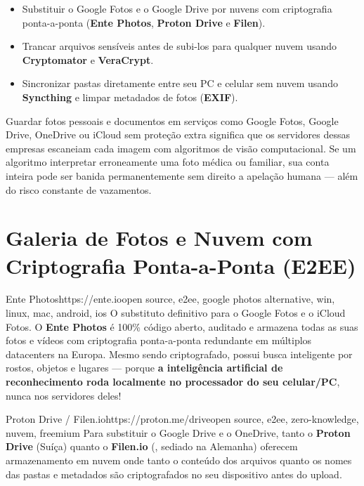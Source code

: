 \documentclass{pousadaguide}
\begin{document}
\begin{missao}
\begin{itemize}
  \item Substituir o Google Fotos e o Google Drive por nuvens com criptografia ponta-a-ponta (\textbf{Ente Photos}, \textbf{Proton Drive} e \textbf{Filen}).
  \item Trancar arquivos sensíveis antes de subi-los para qualquer nuvem usando \textbf{Cryptomator} e \textbf{VeraCrypt}.
  \item Sincronizar pastas diretamente entre seu PC e celular sem nuvem usando \textbf{Syncthing} e limpar metadados de fotos (\textbf{EXIF}).
\end{itemize}
\end{missao}

Guardar fotos pessoais e documentos em serviços como Google Fotos, Google Drive, OneDrive ou iCloud sem proteção extra significa que os servidores dessas empresas escaneiam cada imagem com algoritmos de visão computacional. Se um algoritmo interpretar erroneamente uma foto médica ou familiar, sua conta inteira pode ser banida permanentemente sem direito a apelação humana — além do risco constante de vazamentos.

\section{Galeria de Fotos e Nuvem com Criptografia Ponta-a-Ponta (E2EE)}

\begin{ferramenta}[goat,logo=ente]{Ente Photos}{https://ente.io}{open source, e2ee, google photos alternative, win, linux, mac, android, ios}
O substituto definitivo para o Google Fotos e o iCloud Fotos. O \textbf{Ente Photos} é 100\% código aberto, auditado e armazena todas as suas fotos e vídeos com criptografia ponta-a-ponta redundante em múltiplos datacenters na Europa. Mesmo sendo criptografado, possui busca inteligente por rostos, objetos e lugares — porque \textbf{a inteligência artificial de reconhecimento roda localmente no processador do seu celular/PC}, nunca nos servidores deles! 
\end{ferramenta}

\begin{ferramenta}[goat,logo=protondrive]{Proton Drive / Filen.io}{https://proton.me/drive}{open source, e2ee, zero-knowledge, nuvem, freemium}
Para substituir o Google Drive e o OneDrive, tanto o \textbf{Proton Drive} (Suíça) quanto o \textbf{Filen.io} (, sediado na Alemanha) oferecem armazenamento em nuvem onde tanto o conteúdo dos arquivos quanto os nomes das pastas e metadados são criptografados no seu dispositivo antes do upload. 
\end{ferramenta}
\end{document}
